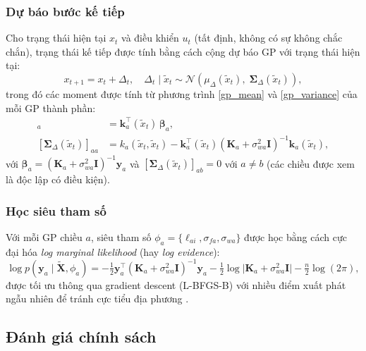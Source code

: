 \subsubsection{Dự báo bước kế tiếp}
\label{SUB_SUB_SEC_one_step_prediction}

Cho trạng thái hiện tại $x_t$ và điều khiển $u_t$ (tất định, không có sự không chắc chắn), trạng thái kế tiếp được tính bằng cách cộng dự báo GP với trạng thái hiện tại:
\begin{equation}
    x_{t+1} = x_t + \Delta_t, \quad \Delta_t \mid \tilde{x}_t \sim \mathcal{N}(\mu_{\Delta}(\tilde{x}_t),\; \boldsymbol{\Sigma}_{\Delta}(\tilde{x}_t)),
    \label{du_bao_buoc_ke}
\end{equation}
trong đó các moment được tính từ phương trình \eqref{gp_mean} và \eqref{gp_variance} của mỗi GP thành phần:
\begin{align}
    [\mu_{\Delta}(\tilde{x}_t)]_a &= \mathbf{k}_a^\top(\tilde{x}_t)\,\boldsymbol{\beta}_a, \label{mean_delta} \\
    [\boldsymbol{\Sigma}_{\Delta}(\tilde{x}_t)]_{aa} &= k_a(\tilde{x}_t, \tilde{x}_t) - \mathbf{k}_a^\top(\tilde{x}_t)(\mathbf{K}_a + \sigma_{wa}^2 \mathbf{I})^{-1} \mathbf{k}_a(\tilde{x}_t), \label{var_delta}
\end{align}
với $\boldsymbol{\beta}_a = (\mathbf{K}_a + \sigma_{wa}^2 \mathbf{I})^{-1} \mathbf{y}_a$ và $[\boldsymbol{\Sigma}_{\Delta}(\tilde{x}_t)]_{ab} = 0$ với $a \neq b$ (các chiều được xem là độc lập có điều kiện).

\subsubsection{Học siêu tham số}
\label{SUB_SUB_SEC_hyperparameter_learning}

Với mỗi GP chiều $a$, siêu tham số $\phi_a = \{\ell_{ai}, \sigma_{fa}, \sigma_{wa}\}$ được học bằng cách cực đại hóa \textit{log marginal likelihood} (hay \textit{log evidence}):
\begin{equation}
    \log p(\mathbf{y}_a \mid \tilde{\mathbf{X}}, \phi_a) = -\tfrac{1}{2}\mathbf{y}_a^\top (\mathbf{K}_a + \sigma_{wa}^2 \mathbf{I})^{-1} \mathbf{y}_a - \tfrac{1}{2}\log\lvert \mathbf{K}_a + \sigma_{wa}^2 \mathbf{I} \rvert - \tfrac{n}{2}\log(2\pi),
    \label{log_evidence}
\end{equation}
được tối ưu thông qua gradient descent (L-BFGS-B) với nhiều điểm xuất phát ngẫu nhiên để tránh cực tiểu địa phương \cite{Rasmussen_Williams_2006}.

\subsection{Đánh giá chính sách}
\label{SUB_SEC_policy_eval}

